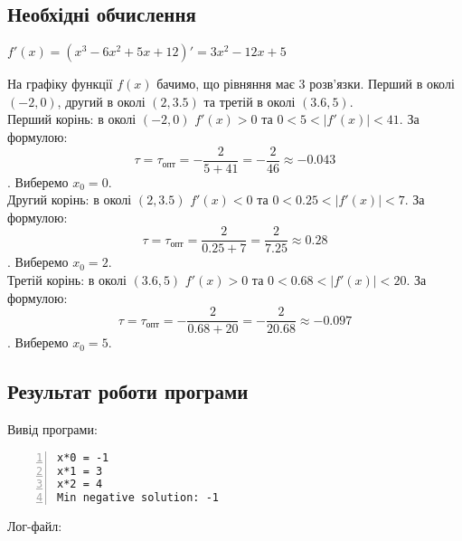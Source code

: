 \documentclass[a4paper, 12pt]{article}
\begin{document}

\subsection{Необхідні обчислення}

$f'(x) = (x^3 - 6x^2 + 5x + 12)' = 3x^2 - 12x + 5$

На графіку функції $f(x)$ бачимо, що рівняння має 3 розв'язки. Перший в околі $\left( -2 , 0 \right)$, другий в околі $\left( 2 , 3.5 \right)$ та третій в околі $\left( 3.6 , 5 \right)$.\\

Перший корінь: в околі $\left( -2 , 0 \right)$ $f'(x) > 0$ та $0 < 5 < |f'(x)| < 41$. За формулою:
\[ \tau = \tau_{\text{опт}} = -\frac{2}{5 + 41} = -\frac{2}{46} \approx -0.043 \].
Виберемо $x_0 = 0 $. \\

Другий корінь: в околі $\left( 2 , 3.5 \right)$ $f'(x) < 0$ та $0 < 0.25 < |f'(x)| < 7$. За формулою:
\[ \tau = \tau_{\text{опт}} = \frac{2}{0.25 + 7} = \frac{2}{7.25} \approx 0.28 \].
Виберемо $x_0 = 2 $.\\

Третій корінь: в околі $\left( 3.6 , 5 \right)$ $f'(x) > 0$ та $0 < 0.68 < |f'(x)| < 20$. За формулою:
\[ \tau = \tau_{\text{опт}} = -\frac{2}{0.68 + 20} = -\frac{2}{20.68} \approx -0.097 \].
Виберемо $x_0 = 5 $.

\subsection{Результат роботи програми}

Вивід програми:

\begin{Verbatim}[numbers=left,xleftmargin=20mm]
x*0 = -1
x*1 = 3
x*2 = 4
Min negative solution: -1
\end{Verbatim}

Лог-файл:
\end{document}
